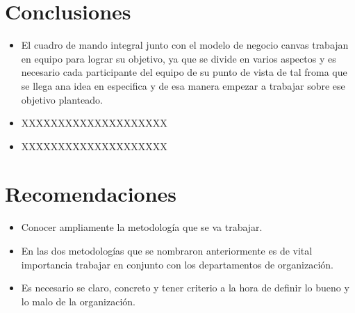 \documentclass[preprint,12pt]{elsarticle}
\begin{document}

\section{Conclusiones}

	\begin{itemize}
		\item El cuadro de mando integral junto con el modelo de negocio canvas trabajan en equipo para lograr su objetivo, ya que se divide en varios aspectos y es necesario cada participante del equipo de su punto de vista de tal froma que se llega ana idea en especifica y de esa manera empezar a trabajar sobre ese objetivo planteado.
		\item XXXXXXXXXXXXXXXXXXXX
		\item XXXXXXXXXXXXXXXXXXXX
	\end{itemize}


\section{Recomendaciones}	

	\begin{itemize}
		\item Conocer ampliamente la metodología que se va trabajar.
		\item En las dos metodologías que se nombraron anteriormente es de vital importancia trabajar en conjunto con los departamentos de organización.
		\item Es necesario se claro, concreto y tener criterio a la hora de definir lo bueno y lo malo de la organización.
	\end{itemize}



	
	\newpage
	
		
\end{document}
